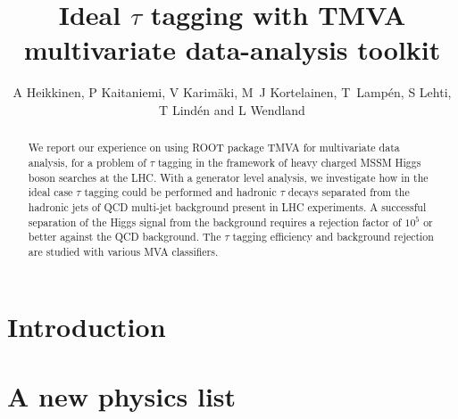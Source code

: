 \documentclass[a4paper]{jpconf}
\begin{document}
\title{Ideal $\tau$ tagging with TMVA multivariate data-analysis toolkit}

\author{A Heikkinen, P Kaitaniemi, V Karim\"{a}ki,
M~J Kortelainen, T~Lamp\'{e}n, S Lehti, T Lind\'{e}n and L Wendland} 

\address{Helsinki Institute of Physics, P.O. Box 64, FIN-00014 University of Helsinki, Finland}



\begin{abstract}
We report our experience on using ROOT package TMVA for
multivariate data analysis, for a problem of $\tau$ tagging in the
framework of heavy charged MSSM Higgs boson searches at the LHC.
With a generator level analysis,
we investigate how in the ideal case $\tau$ tagging could be performed and
hadronic $\tau$ decays separated from the
hadronic jets of QCD multi-jet background present in LHC experiments.
A successful separation of the Higgs signal from the background
requires a rejection factor of $10^5$ or better against the QCD background.
The $\tau$ tagging efficiency and background rejection are studied with various MVA classifiers.
\end{abstract}


\section{Introduction}
\cite{abla}


\section{A new physics list}


 
\end{document}
